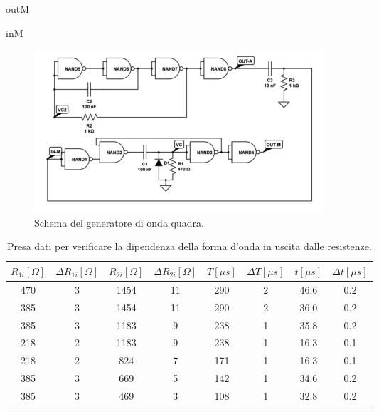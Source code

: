 \documentclass[10pt,a4paper]{article}
\begin{document}


outM

inM





\begin{figure}[!htb]
  \centering
  \includegraphics[scale=0.5]{generatorequadra.png}
\caption{Schema del generatore di onda quadra.\label{fig:generatorequadra}}
\end{figure}



\begin{table}[!htb]
\centering
\begin{tabular}{|c|c|c|c|c|c|c|c|}
\hline 
$R_{1i} [\Omega]$ & $\Delta R_{1i} [\Omega]$ & $R_{2i} [\Omega]$  & $\Delta R_{2i} [\Omega]$ & $T [\mu s]$ & $\Delta T [\mu s]$&$t [\mu s ]$ & $\Delta t [\mu s]$\\
\hline
 470 & 3 & 1454	& 11 & 290 & 2& 46.6& 0.2\\ 
\hline
385 & 3 & 1454	& 11 & 290 & 2& 36.0& 0.2\\ 
\hline 
 385 & 3 & 1183	& 9 & 238 & 1& 35.8& 0.2\\
\hline
218 & 2 & 1183	& 9 & 238 & 1& 16.3& 0.1\\ 
\hline
218 & 2 & 824	& 7 & 171 & 1& 16.3& 0.1\\ 
\hline
385 & 3 & 669	& 5 & 142 & 1& 34.6& 0.2\\ 
\hline
 385 & 3 & 469	& 3 & 108 & 1& 32.8& 0.2\\ 
 \hline
\end{tabular} 
\caption{Presa dati per verificare la dipendenza della forma d'onda in uscita dalle resistenze.\label{tab:generatore}}
\end{table}
\end{document}
